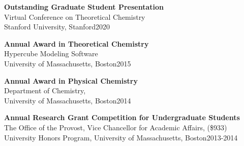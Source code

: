 \documentclass[letterpaper]{article}
\renewenvironment{itemize}{
  \begin{list}{}{
    \setlength{\leftmargin}{1.5em}
  }
}{
  \end{list}
}
\begin{document}
\begin{itemize}

\item \textbf{Outstanding Graduate Student Presentation}\\
Virtual Conference on Theoretical Chemistry\\
Stanford University, Stanford\hfill 2020

\item \textbf{Annual Award in Theoretical Chemistry}\\
Hypercube Modeling Software\\
University of Massachusetts, Boston\hfill 2015




\item \textbf{Annual Award in Physical Chemistry}\\
Department of Chemistry,\\
University of Massachusetts, Boston\hfill 2014


\item \textbf{Annual Research Grant Competition for Undergraduate Students}\\
The Office of the Provost, Vice Chancellor for Academic Affairs, (\$933)\\
University Honors Program, University of Massachusetts, Boston\hfill 2013-2014



\end{itemize}
\end{document}

